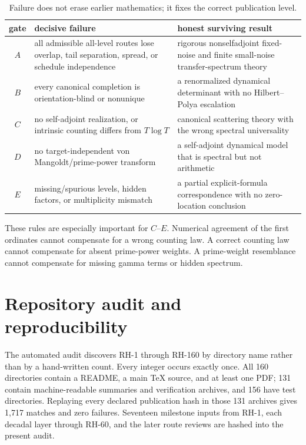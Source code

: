 \documentclass[11pt]{article}
\theoremstyle{definition}
\theoremstyle{remark}
\begin{document}
\begin{table}[ht]
\centering
\small
\renewcommand{\arraystretch}{1.12}
\begin{tabular}{c>{\raggedright\arraybackslash}p{5.4cm}>{\raggedright\arraybackslash}p{6.4cm}}
\toprule
gate & decisive failure & honest surviving result\\
\midrule
$A$ & all admissible all-level routes lose overlap, tail separation, spread,
or schedule independence & rigorous nonselfadjoint fixed-noise and finite
small-noise transfer-spectrum theory\\
$B$ & every canonical completion is orientation-blind or nonunique & a
renormalized dynamical determinant with no Hilbert--Polya escalation\\
$C$ & no self-adjoint realization, or intrinsic counting differs from
$T\log T$ & canonical scattering theory with the wrong spectral universality\\
$D$ & no target-independent von Mangoldt/prime-power transform & a
self-adjoint dynamical model that is spectral but not arithmetic\\
$E$ & missing/spurious levels, hidden factors, or multiplicity mismatch & a
partial explicit-formula correspondence with no zero-location conclusion\\
\bottomrule
\end{tabular}
\caption{Failure does not erase earlier mathematics; it fixes the correct
publication level.}
\label{tab:stopping}
\end{table}

These rules are especially important for $C$--$E$.  Numerical agreement of
the first ordinates cannot compensate for a wrong counting law.  A correct
counting law cannot compensate for absent prime-power weights.  A
prime-weight resemblance cannot compensate for missing gamma terms or hidden
spectrum.

\section{Repository audit and reproducibility}

The automated audit discovers RH-1 through RH-160 by directory name rather
than by a hand-written count.  Every integer occurs exactly once.  All 160
directories contain a README, a main TeX source, and at least one PDF; 131
contain machine-readable summaries and verification archives, and 156 have
test directories.  Replaying every declared publication hash in those 131
archives gives 1,717 matches and zero failures.  Seventeen milestone inputs
from RH-1, each decadal layer through RH-60, and the later route reviews are
hashed into the present audit.
\end{document}
